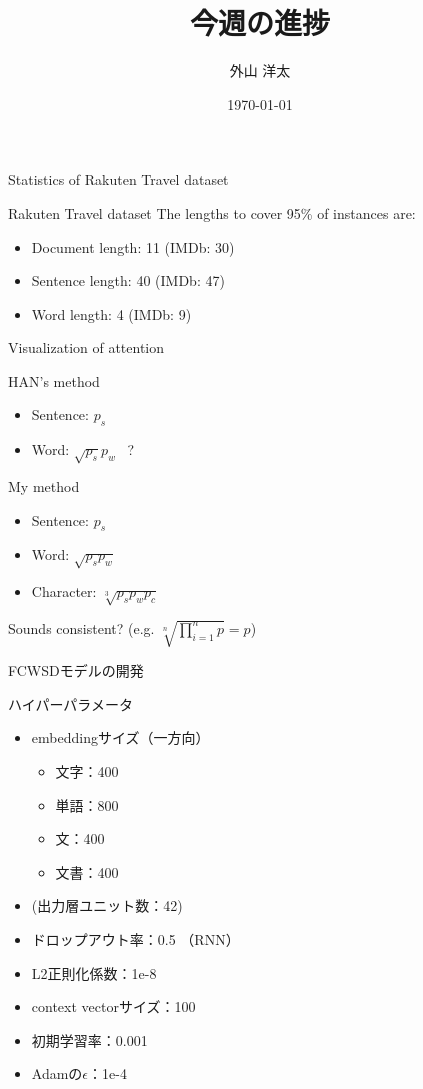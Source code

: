 \documentclass[aspectratio=43,unicode,10pt]{beamer}
\title{今週の進捗}
\institute{知能数理研究室}
\author{外山 洋太}
\date{\today}
\begin{document}
\begin{frame}
\titlepage
\end{frame}

\begin{frame}{Statistics of Rakuten Travel dataset}
  \begin{block}{Rakuten Travel dataset}
    The lengths to cover 95\% of instances are:
    \begin{itemize}
      \item Document length: 11 (IMDb: 30)
      \item Sentence length: 40 (IMDb: 47)
      \item Word length: 4 (IMDb: 9)
    \end{itemize}
  \end{block}
\end{frame}

\begin{frame}{Visualization of attention}
  \begin{block}{HAN's method}
    \begin{itemize}
      \item Sentence: $p_s$
      \item Word: $\sqrt{p_s}p_w$ \leftarrow~?
    \end{itemize}
  \end{block}
  \begin{block}{My method}
    \begin{itemize}
      \item Sentence: $p_s$
      \item Word: $\sqrt{p_s p_w}$
      \item Character: $\sqrt[3]{p_s p_w p_c}$
    \end{itemize}
    Sounds consistent? (e.g. $\sqrt[n]{\prod_{i=1}^n p} = p$)
  \end{block}
\end{frame}

\begin{frame}{FCWSDモデルの開発}
  \begin{block}{ハイパーパラメータ}
    \begin{itemize}
      \item embeddingサイズ（一方向）
        \begin{itemize}
          \item 文字：400
          \item 単語：800
          \item 文：400
          \item 文書：400
        \end{itemize}
      \item (出力層ユニット数：42)
      \item ドロップアウト率：0.5 （RNN）
      \item L2正則化係数：1e-8
      \item context vectorサイズ：100
      \item 初期学習率：0.001
      \item Adamの$\epsilon$：1e-4
    \end{itemize}
  \end{block}
\end{frame}
\end{document}
